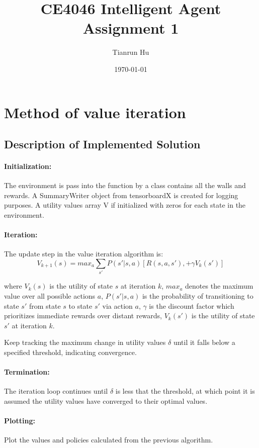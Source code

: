 \documentclass{article}
\title{CE4046 Intelligent Agent Assignment 1}
\author{Tianrun Hu}
\date{\today}
\begin{document}
\maketitle

\section{Method of value iteration}

\subsection{Description of Implemented Solution}

\paragraph{Initialization:} The environment is pass into the function by a class contains all the walls and rewards. A SummaryWriter object from tensorboardX is created for logging purposes. A utility values array V if initialized with zeros for each state in the environment.

\paragraph{Iteration:} The update step in the value iteration algorithm is:
\[V_{k+1}(s) = max_a \sum_{s'}P(s'|s, a) [R(s, a, s'), + \gamma V_k(s')] \]

where $V_k(s)$ is the utility of state $s$ at iteration $k$, $max_a$ denotes the maximum value over all possible actions $a$, $P(s' | s, a) $ is the probability of transitioning to state $s'$ from state $s$ to state $s'$ via action $a$, $\gamma$ is the discount factor which prioritizes immediate rewards over distant rewards, $V_k(s')$ is the utility of state $s'$ at iteration $k$.

Keep tracking the maximum change in utility values $\delta$ until it falls below a specified threshold, indicating convergence.

\paragraph{Termination:} The iteration loop continues until $\delta$ is less that the threshold, at which point it is assumed the utility values have converged to their optimal values.

\paragraph{Plotting:} Plot the values and policies calculated from the previous algorithm.
\end{document}

